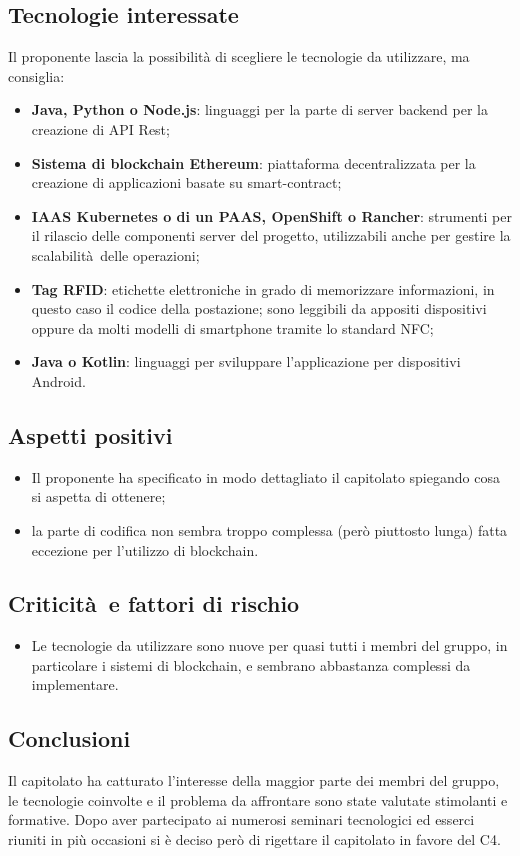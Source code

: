 \subsection{Tecnologie interessate}
Il proponente lascia la possibilità di scegliere le tecnologie da utilizzare, ma consiglia:
\begin{itemize}
    \item \textbf{Java, Python o Node.js}: linguaggi per la parte di server backend per la creazione di API Rest;
    \item \textbf{Sistema di blockchain Ethereum}: piattaforma decentralizzata per la creazione di applicazioni basate su smart-contract;
    \item \textbf{IAAS Kubernetes o di un PAAS, OpenShift o Rancher}: strumenti per il rilascio delle componenti server del progetto, utilizzabili anche per gestire la scalabilità delle operazioni;
    \item \textbf{Tag RFID}: etichette elettroniche in grado di memorizzare informazioni, in questo caso il codice della postazione; sono leggibili da appositi dispositivi oppure da molti modelli di smartphone tramite lo standard NFC;
    \item \textbf{Java o Kotlin}: linguaggi per sviluppare l'applicazione per dispositivi Android.
\end{itemize}
\subsection{Aspetti positivi}
\begin{itemize}
    \item Il proponente ha specificato in modo dettagliato il capitolato spiegando cosa si aspetta di ottenere;
    \item la parte di codifica non sembra troppo complessa (però piuttosto lunga) fatta eccezione per l'utilizzo di blockchain.
\end{itemize}
\subsection{Criticità e fattori di rischio}
\begin{itemize}
    \item Le tecnologie da utilizzare sono nuove per quasi tutti i membri del gruppo, in particolare i sistemi di blockchain, e sembrano abbastanza complessi da implementare.
\end{itemize}
\subsection{Conclusioni}
Il capitolato ha catturato l'interesse della maggior parte dei membri del gruppo, le tecnologie coinvolte e il problema da affrontare sono state valutate stimolanti e formative.
Dopo aver partecipato ai numerosi seminari tecnologici ed esserci riuniti in più occasioni si è deciso però di rigettare il capitolato in favore del C4.
